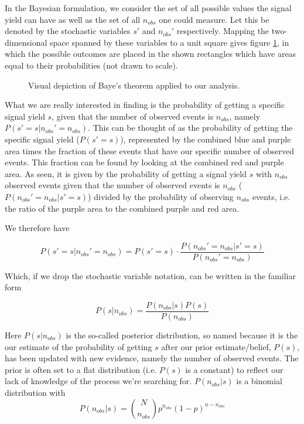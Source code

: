 \documentclass{article}
\begin{document}
\begin{titlepage}
In the Bayesian formulation, we consider the set of all possible values the signal yield can have as well as the set of all $n_{obs}$ one could measure. Let this be denoted by the stochastic variables $s'$ and $n_{obs}'$ respectively. Mapping the two-dimensional space spanned by these variables to a unit square gives figure \ref{fig:Bayes}, in which the possible outcomes are placed in the shown rectangles which have areas equal to their probabilities (not drawn to scale).  

\begin{figure}[H]
    \begin{center}
        
        \caption{Visual depiction of Baye's theorem applied to our analysis.}
        \label{fig:Bayes}
     \end{center}
\end{figure}

What we are really interested in finding is the probability of getting a specific signal yield $s$, given that the number of observed events is $n_{obs}$, namely $P(s'=s|n_{obs}'=n_{obs})$. This can be thought of as the probability of getting the specific signal yield ($P(s'=s)$), represented by the combined blue and purple area times the fraction of these events that have our specific number of observed events. This fraction can be found by looking at the combined red and purple area. As seen, it is given by the probability of getting a signal yield $s$ with $n_{obs}$ observed events given that the number of observed events is $n_{obs}$ ($P(n_{obs}'=n_{obs}|s'=s)$) divided by the probability of observing $n_{obs}$ events, i.e. the ratio of the purple area to the combined purple and red area. 

We therefore have 

\begin{equation}
    P(s'=s|n_{obs}'=n_{obs}) = P(s'=s) \cdot \frac{P(n_{obs}' = n_{obs}|s'=s)}{P(n_{obs}' = n_{obs})}
\end{equation}

Which, if we drop the stochastic variable notation, can be written in the familiar form 

\begin{equation}
    P(s|n_{obs}) = \frac{P(n_{obs}|s) P(s)}{P(n_{obs})}
\end{equation}

Here $P(s|n_{obs})$ is the so-called posterior distribution, so named because it is the our estimate of the probability of getting $s$ after our prior estimate/belief, $P(s)$, has been updated with new evidence, namely the number of observed events. The prior is often set to a flat distribution (i.e. $P(s)$ is a constant) to reflect our lack of knowledge of the process we're searching for.  $P(n_{obs}|s)$ is a binomial distribution with 
\begin{equation}
    P(n_{obs}|s) = \binom{N}{n_{obs}} p^{n_{obs}}(1-p)^{n-n_{obs}}
\end{equation}


\end{titlepage}
\end{document}
